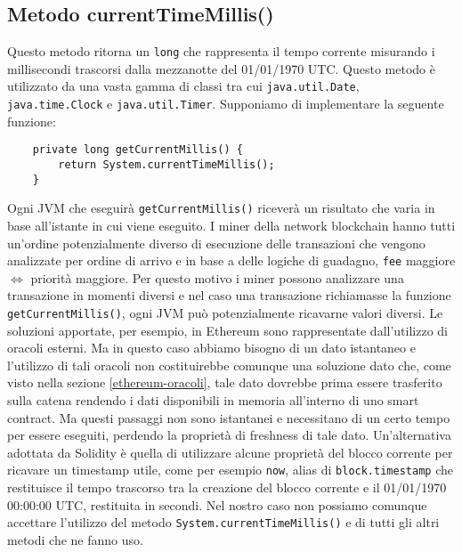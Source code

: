		\subsection{Metodo currentTimeMillis()}
			Questo metodo ritorna un \lstinline|long| che rappresenta il tempo corrente misurando i millisecondi trascorsi dalla mezzanotte del 01/01/1970 UTC. 
			Questo metodo è utilizzato da una vasta gamma di classi tra cui \lstinline|java.util.Date|, \lstinline|java.time.Clock| e \lstinline|java.util.Timer|. Supponiamo di implementare la seguente funzione: 
		\begin{lstlisting}
	private long getCurrentMillis() {
		return System.currentTimeMillis();
	}
		\end{lstlisting}
			Ogni JVM che eseguirà \lstinline|getCurrentMillis()| riceverà un risultato che varia in base all'istante in cui viene eseguito. I miner della network blockchain hanno tutti un'ordine potenzialmente diverso di esecuzione delle transazioni che vengono analizzate per ordine di arrivo e in base a delle logiche di guadagno, \lstinline|fee| maggiore $\Leftrightarrow$ priorità maggiore. Per questo motivo i miner possono analizzare una transazione in momenti diversi e nel caso una transazione richiamasse la funzione \lstinline|getCurrentMillis()|, ogni JVM può potenzialmente ricavarne valori diversi. Le soluzioni apportate, per esempio, in Ethereum sono rappresentate dall'utilizzo di oracoli esterni. Ma in questo caso abbiamo bisogno di un dato istantaneo e l'utilizzo di tali oracoli non costituirebbe comunque una soluzione dato che, come visto nella sezione \ref{ethereum-oracoli}, tale dato dovrebbe prima essere trasferito sulla catena rendendo i dati disponibili in memoria all'interno di uno smart contract. Ma questi passaggi non sono istantanei e necessitano di un certo tempo per essere eseguiti, perdendo la proprietà di freshness di tale dato. Un'alternativa adottata da Solidity è quella di utilizzare alcune proprietà del blocco corrente per ricavare un timestamp utile, come per esempio \lstinline|now|, alias di \lstinline|block.timestamp| che restituisce il tempo trascorso tra la creazione del blocco corrente e il 01/01/1970 00:00:00 UTC, restituita in secondi.
			Nel nostro caso non possiamo comunque accettare l'utilizzo del metodo \lstinline|System.currentTimeMillis()| e di tutti gli altri metodi che ne fanno uso.
		
